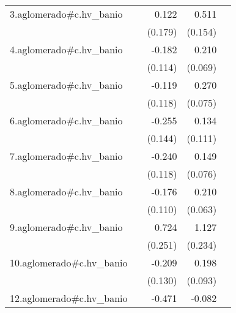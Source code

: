 {\begin{longtable}{l*{4}{D{.}{.}{-1}}}
\addlinespace
3.aglomerado#c.hv\_banio&                     &       0.122         &       0.511\sym{***}&                     \\
            &                     &     (0.179)         &     (0.154)         &                     \\
\addlinespace
4.aglomerado#c.hv\_banio&                     &      -0.182         &       0.210\sym{**} &                     \\
            &                     &     (0.114)         &     (0.069)         &                     \\
\addlinespace
5.aglomerado#c.hv\_banio&                     &      -0.119         &       0.270\sym{***}&                     \\
            &                     &     (0.118)         &     (0.075)         &                     \\
\addlinespace
6.aglomerado#c.hv\_banio&                     &      -0.255         &       0.134         &                     \\
            &                     &     (0.144)         &     (0.111)         &                     \\
\addlinespace
7.aglomerado#c.hv\_banio&                     &      -0.240\sym{*}  &       0.149\sym{*}  &                     \\
            &                     &     (0.118)         &     (0.076)         &                     \\
\addlinespace
8.aglomerado#c.hv\_banio&                     &      -0.176         &       0.210\sym{***}&                     \\
            &                     &     (0.110)         &     (0.063)         &                     \\
\addlinespace
9.aglomerado#c.hv\_banio&                     &       0.724\sym{**} &       1.127\sym{***}&                     \\
            &                     &     (0.251)         &     (0.234)         &                     \\
\addlinespace
10.aglomerado#c.hv\_banio&                     &      -0.209         &       0.198\sym{*}  &                     \\
            &                     &     (0.130)         &     (0.093)         &                     \\
\addlinespace
12.aglomerado#c.hv\_banio&                     &      -0.471\sym{***}&      -0.082         &                     \\

\end{longtable}}
